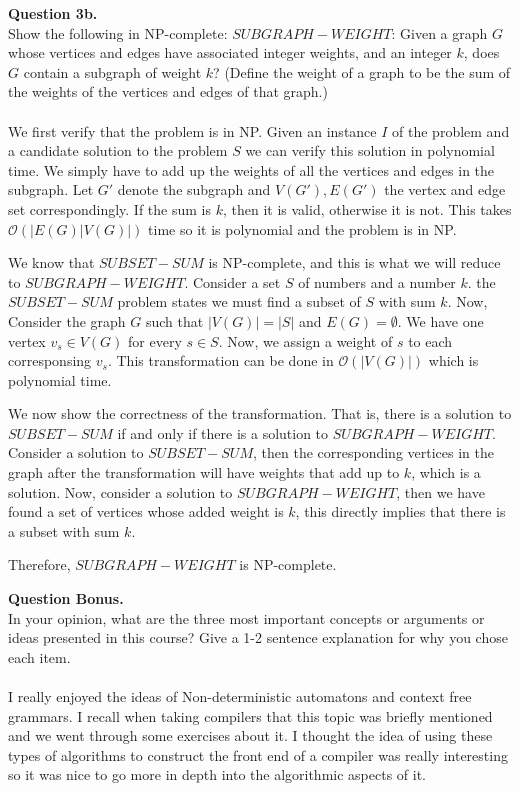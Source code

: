 \documentclass{article}
\newcommand{\bigo}[1]{\mathcal{O}(#1)}
\newenvironment{question}[2]
{
    {\large \textbf{Question #1.}}\\
    #2\\\\
}{\newpage}
\begin{document}
\begin{question}
    {3b}
    {Show the following in NP-complete: $SUBGRAPH-WEIGHT$: Given a graph $G$ whose vertices and edges have
        associated integer weights, and an integer $k$, does $G$ contain a subgraph of
        weight $k$? (Define the weight of a graph to be the sum of the weights of the vertices and edges of that graph.)}

    We first verify that the problem is in NP. Given an instance $I$ of the problem and a candidate solution to the problem $S$
    we can verify this solution in polynomial time. We simply have to add up the weights of all the vertices and edges in the subgraph.
    Let $G'$ denote the subgraph and $V(G'), E(G')$ the vertex and edge set correspondingly.
    If the sum is $k$, then it is valid, otherwise it is not. This takes $\bigo{|E(G)|V(G)|}$ time so it is polynomial and the problem
    is in NP.

    We know that $SUBSET-SUM$ is NP-complete, and this is what we will reduce to $SUBGRAPH-WEIGHT$. Consider a set $S$ of
    numbers and a number $k$. the $SUBSET-SUM$ problem states we must find a subset of $S$ with sum $k$. Now, Consider the
    graph $G$ such that $|V(G)| = |S|$ and $E(G) = \emptyset$. We have one vertex $v_s \in V(G)$ for every $s \in S$. Now, we
    assign a weight of $s$ to each corresponsing $v_s$. This transformation can be done in $\bigo{|V(G)|}$ which is
    polynomial time.

    We now show the correctness of the transformation. That is, there is a solution to $SUBSET-SUM$ if and only if there is
    a solution to $SUBGRAPH-WEIGHT$. Consider a solution to $SUBSET-SUM$, then the corresponding vertices in the graph after the
    transformation will have weights that add up to $k$, which is a solution. Now, consider a solution to $SUBGRAPH-WEIGHT$, then
    we have found a set of vertices whose added weight is $k$, this directly implies that there is a subset with sum $k$.

    Therefore, $SUBGRAPH-WEIGHT$ is NP-complete.
\end{question}

\begin{question}
    {Bonus}
    {In your opinion, what are the three most important concepts or arguments or ideas
        presented in this course? Give a 1-2 sentence explanation for why you chose each
        item.}

    I really enjoyed the ideas of Non-deterministic automatons and  context free grammars. I recall when taking compilers that this topic was briefly
    mentioned and we went through some exercises about it. I thought the idea of using these types of algorithms to construct the front
    end of a compiler was really interesting so it was nice to go more in depth into the algorithmic aspects of it.
\end{question}
\end{document}
